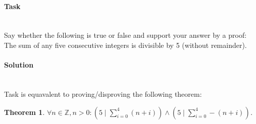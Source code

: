 \documentclass[11pt]{article}
\begin{document}
   \paragraph{Task}\mbox{} \\
   Say whether the following is true or false and support your answer by a proof: The sum of any five consecutive integers is divisible by 5 (without remainder).
   \paragraph{Solution}\mbox{} \\
   Task is equavalent to proving/disproving the following theorem:
   \newtheorem*{Theorem}{Theorem}
   \begin{Theorem}
       $\displaystyle \forall n \in \mathbb{Z}, n > 0: \left( 5 \mid \sum_{i = 0}^{4}\left(n + i\right) \right) \land \left( 5 \mid \sum_{i = 0}^{4}-(n + i) \right)$.
   \end{Theorem}
\end{document}
